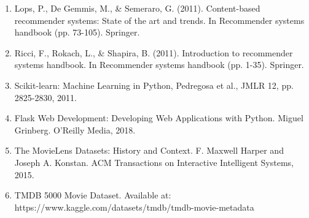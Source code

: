 \documentclass[12pt,a4paper]{article}
\begin{document}
\begin{enumerate}
    \item Lops, P., De Gemmis, M., \& Semeraro, G. (2011). Content-based recommender systems: State of the art and trends. In Recommender systems handbook (pp. 73-105). Springer.
    \item Ricci, F., Rokach, L., \& Shapira, B. (2011). Introduction to recommender systems handbook. In Recommender systems handbook (pp. 1-35). Springer.
    \item Scikit-learn: Machine Learning in Python, Pedregosa et al., JMLR 12, pp. 2825-2830, 2011.
    \item Flask Web Development: Developing Web Applications with Python. Miguel Grinberg. O'Reilly Media, 2018.
    \item The MovieLens Datasets: History and Context. F. Maxwell Harper and Joseph A. Konstan. ACM Transactions on Interactive Intelligent Systems, 2015.
    \item TMDB 5000 Movie Dataset. Available at: https://www.kaggle.com/datasets/tmdb/tmdb-movie-metadata
\end{enumerate}
\end{document}

